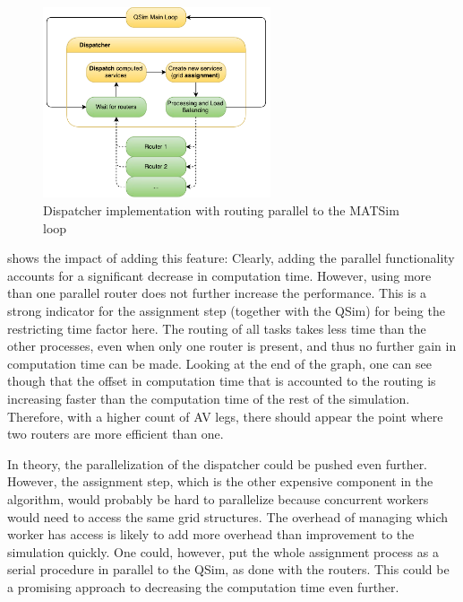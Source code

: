 \begin{figure}
    \centering
    \includegraphics[width=0.6\textwidth]{figures/parallelrouting.pdf}
    \caption{Dispatcher implementation with routing parallel to the MATSim loop}
    \label{fig:parallelrouting}
\end{figure}

 shows the impact of adding this feature: Clearly, adding the
parallel functionality accounts for a significant decrease in computation time.
However, using more than one parallel router does not further increase the performance.
This is a strong indicator for the assignment step (together with the QSim) for
being the restricting time factor here. The routing of all tasks takes less time
than the other processes, even when only one router is present, and thus no further
gain in computation time can be made. Looking at the end of the graph, one can see
though that the offset in computation time that is accounted to the routing
is increasing faster than the computation time of the rest of the simulation. Therefore,
with a higher count of AV legs, there should appear the point where two routers
are more efficient than one.

In theory, the parallelization of the dispatcher could be pushed even further.
However, the assignment step, which is the other expensive component in the algorithm,
would probably be hard to parallelize because concurrent workers
would need to access the same grid structures. The overhead of managing which
worker has access is likely to add more overhead than improvement to
the simulation quickly. One could, however, put the whole assignment process as a serial
procedure in parallel to the QSim, as done with the routers. This could be a
promising approach to decreasing the computation time even further.

